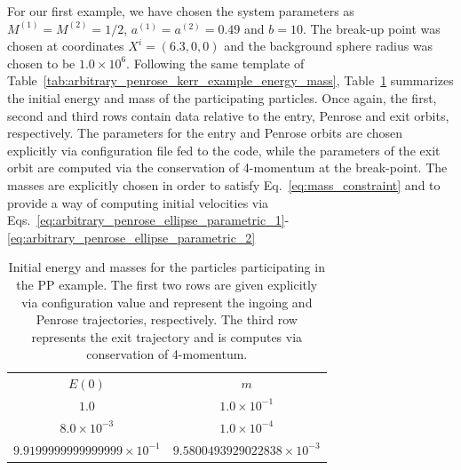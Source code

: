 For our first example, we have chosen the system parameters as $M^{(1)} = M^{(2)} = 1/2$, $a^{(1)} = a^{(2)} = 0.49$ and $b = 10$. The break-up point was chosen at coordinates $X^i = (6.3, 0, 0)$ and the background sphere radius was chosen to be $1.0 \times 10^6$. Following the same template of Table~\ref{tab:arbitrary_penrose_kerr_example_energy_mass}, Table~\ref{tab:arbitrary_penrose_sks_example_energy_mass} summarizes the initial energy and mass of the participating particles. Once again, the first, second and third rows contain data relative to the entry, Penrose and exit orbits, respectively. The parameters for the entry and Penrose orbits are chosen explicitly via configuration file fed to the code, while the parameters of the exit orbit are computed via the conservation of 4-momentum at the break-point. The masses are explicitly chosen in order to satisfy Eq.~\eqref{eq:mass_constraint} and to provide a way of computing initial velocities via Eqs.~\eqref{eq:arbitrary_penrose_ellipse_parametric_1}-\eqref{eq:arbitrary_penrose_ellipse_parametric_2}
%
\begin{table}[]
  \centering
  \begin{tabular}{cc}
    \hline\hline
    $E(0)$                              & $m$                                 \\
    $1.0$                               & $1.0 \times 10^{-1}$                \\
    $8.0 \times 10^{-3}$                & $1.0 \times 10^{-4}$                \\
    $9.9199999999999999 \times 10^{-1}$ & $9.5800493929022838 \times 10^{-3}$ \\ \hline\hline
  \end{tabular}
  \caption{Initial energy and masses for the particles participating in the PP example. The first two rows are given explicitly via configuration value and represent the ingoing and Penrose trajectories, respectively. The third row represents the exit trajectory and is computes via conservation of 4-momentum.}
  \label{tab:arbitrary_penrose_sks_example_energy_mass}
\end{table}

